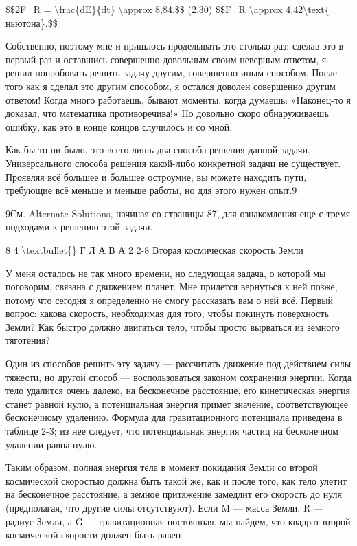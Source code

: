 \documentclass[10pt,oneside]{article}
\begin{document}
\$\$2F\_R = \textbackslash{}frac\{dE\}\{dt\} \textbackslash{}approx 8,84.\$\$ (2.30) \$\$F\_R \textbackslash{}approx 4,42\textbackslash{}text\{ ньютона\}.\$\$\par

Собственно, поэтому мне и пришлось проделывать это столько раз: сделав это в первый раз и оставшись совершенно довольным своим неверным ответом, я решил попробовать решить задачу другим, совершенно иным способом. После того как я сделал это другим способом, я остался доволен совершенно другим ответом! Когда много работаешь, бывают моменты, когда думаешь: «Наконец-то я доказал, что математика противоречива!» Но довольно скоро обнаруживаешь ошибку, как это в конце концов случилось и со мной.\par

Как бы то ни было, это всего лишь два способа решения данной задачи. Универсального способа решения какой-либо конкретной задачи не существует. Проявляя всё большее и большее остроумие, вы можете находить пути, требующие всё меньше и меньше работы, но для этого нужен опыт.9\par

9См. Alternate Solutions, начиная со страницы 87, для ознакомления еще с тремя подходами к решению этой задачи.\par

8 4 \textbackslash{}textbullet\{\} Г Л А В А  2 2-8 Вторая космическая скорость Земли\par

У меня осталось не так много времени, но следующая задача, о которой мы поговорим, связана с движением планет. Мне придется вернуться к ней позже, потому что сегодня я определенно не смогу рассказать вам о ней всё. Первый вопрос: какова скорость, необходимая для того, чтобы покинуть поверхность Земли? Как быстро должно двигаться тело, чтобы просто вырваться из земного тяготения?\par

Один из способов решить эту задачу --- рассчитать движение под действием силы тяжести, но другой способ --- воспользоваться законом сохранения энергии. Когда тело удалится очень далеко, на бесконечное расстояние, его кинетическая энергия станет равной нулю, а потенциальная энергия примет значение, соответствующее бесконечному удалению. Формула для гравитационного потенциала приведена в таблице 2-3; из нее следует, что потенциальная энергия частиц на бесконечном удалении равна нулю.\par

Таким образом, полная энергия тела в момент покидания Земли со второй космической скоростью должна быть такой же, как и после того, как тело улетит на бесконечное расстояние, а земное притяжение замедлит его скорость до нуля (предполагая, что другие силы отсутствуют). Если M --- масса Земли, R --- радиус Земли, а G --- гравитационная постоянная, мы найдем, что квадрат второй космической скорости должен быть равен\par
\end{document}
